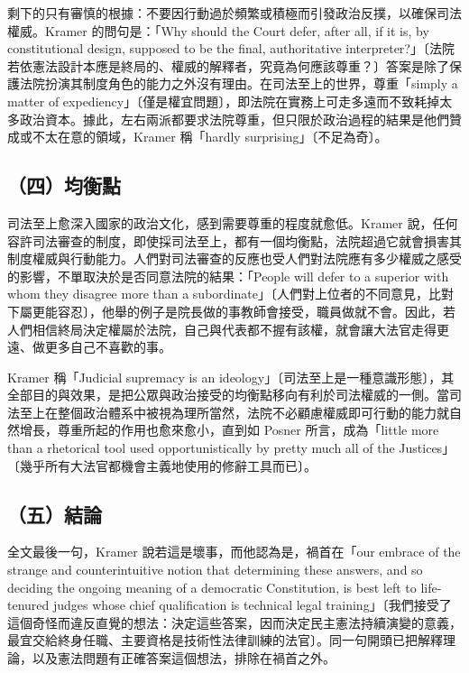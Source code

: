 剩下的只有審慎的根據：不要因行動過於頻繁或積極而引發政治反撲，以確保司法權威。Kramer 的問句是：「Why should the Court defer, after all, if it is, by constitutional design, supposed to be the final, authoritative interpreter?」〔法院若依憲法設計本應是終局的、權威的解釋者，究竟為何應該尊重？〕答案是除了保護法院扮演其制度角色的能力之外沒有理由。在司法至上的世界，尊重「simply a matter of expediency」〔僅是權宜問題〕，即法院在實務上可走多遠而不致耗掉太多政治資本。據此，左右兩派都要求法院尊重，但只限於政治過程的結果是他們贊成或不太在意的領域，Kramer 稱「hardly surprising」〔不足為奇〕。

\subsection{（四）均衡點}

司法至上愈深入國家的政治文化，感到需要尊重的程度就愈低。Kramer 說，任何容許司法審查的制度，即使採司法至上，都有一個均衡點，法院超過它就會損害其制度權威與行動能力。人們對司法審查的反應也受人們對法院應有多少權威之感受的影響，不單取決於是否同意法院的結果：「People will defer to a superior with whom they disagree more than a subordinate」〔人們對上位者的不同意見，比對下屬更能容忍〕，他舉的例子是院長做的事教師會接受，職員做就不會。因此，若人們相信終局決定權屬於法院，自己與代表都不握有該權，就會讓大法官走得更遠、做更多自己不喜歡的事。

Kramer 稱「Judicial supremacy is an ideology」〔司法至上是一種意識形態〕，其全部目的與效果，是把公眾與政治接受的均衡點移向有利於司法權威的一側。當司法至上在整個政治體系中被視為理所當然，法院不必顧慮權威即可行動的能力就自然增長，尊重所起的作用也愈來愈小，直到如 Posner 所言，成為「little more than a rhetorical tool used opportunistically by pretty much all of the Justices」〔幾乎所有大法官都機會主義地使用的修辭工具而已〕。

\subsection{（五）結論}

全文最後一句，Kramer 說若這是壞事，而他認為是，禍首在「our embrace of the strange and counterintuitive notion that determining these answers, and so deciding the ongoing meaning of a democratic Constitution, is best left to life-tenured judges whose chief qualification is technical legal training」〔我們接受了這個奇怪而違反直覺的想法：決定這些答案，因而決定民主憲法持續演變的意義，最宜交給終身任職、主要資格是技術性法律訓練的法官〕。同一句開頭已把解釋理論，以及憲法問題有正確答案這個想法，排除在禍首之外。

